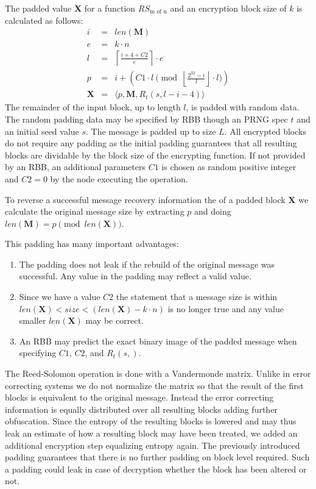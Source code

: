 \documentclass[10pt,journal,compsoc]{IEEEtran}
\begin{document}
The padded value $\mathbf{X}$ for a function $RS_{\text{m of n}}$ and an encryption block size of $k$ is calculated as follows:
\begin{eqnarray}
	i          & = & len(\mathbf{M})\\
	e          & = & k \cdot n\\
	l          & = & \left\lceil\frac{i + 4 + C2 }{e}\right\rceil\cdot e\\
	p          & = & i + \left( C1 \cdot l \pmod{\left\lfloor\frac{2^{32}-i}{l}\right\rfloor\cdot l}\right)\\
	\mathbf{X} & = & \langle p,\mathbf{M},R_{t}\left(s,l-i-4\right)\rangle
\end{eqnarray}	
The remainder of the input block, up to length $l$, is padded with random data. The random padding data may be specified by RBB though an PRNG spec $t$ and an initial seed value $s$. The message is padded up to size $L$. All encrypted blocks do not require any padding as the initial padding guarantees that all resulting blocks are dividable by the block size of the encrypting function. If not provided by an RBB, an additional parameters $C1$ is chosen as random positive integer and $C2=0$  by the node executing the operation.

To reverse a successful message recovery information the of a padded block $\mathbf{X}$ we calculate the original message size by extracting $p$ and doing $len(\mathbf{M})=p \pmod{ len(\mathbf{X})}$.

This padding has many important advantages:
\begin{enumerate}
	\item The padding does not leak if the rebuild of the original message was successful. Any value in the padding may reflect a valid value.
	\item Since we have a value $C2$ the statement that a message size is within $len(\mathbf{X})<size<(len(\mathbf{X})-k\cdot n)$ is no longer true and any value smaller $len(\mathbf{X})$ may be correct.
	\item An RBB may predict the exact binary image of the padded message when specifying $C1$, $C2$, and $R_{t}(s,)$.
\end{enumerate}

The Reed-Solomon operation is done with a Vandermonde matrix. Unlike in error correcting systems we do not normalize the matrix so that the result of the first blocks is equivalent to the original message. Instead the error correcting information is equally distributed over all resulting blocks adding further obfuscation. Since the entropy of the resulting blocks is lowered and may thus leak an estimate of how a resulting block may have been treated, we added an additional encryption step equalizing entropy again. The previously introduced padding guarantees that there is no further padding on block level required. Such a padding could leak in case of decryption whether the block has been altered or not.
\end{document}
